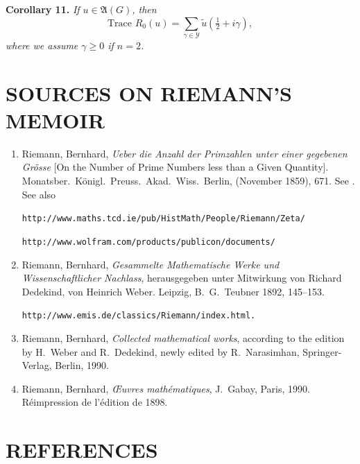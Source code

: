 \documentclass[12pt]{article}
\begin{document}
\medskip

\noindent
\textbf{Corollary 11.} \emph{If $u \in \mathfrak{A}(G)$, then}
\[
\text{Trace } R_{0}(u) = \sum_{\gamma \in \mathcal{Y}} \tilde{u}\left(\tfrac{1}{2} + i\gamma\right),
\]
\emph{where we assume $\gamma \geq 0$ if $n = 2$.}

\section*{SOURCES ON RIEMANN'S MEMOIR}

\begin{enumerate}
\item Riemann, Bernhard, \emph{Ueber die Anzahl der Primzahlen unter einer gegebenen Grösse} [On the Number of Prime Numbers less than a Given Quantity]. Monatsber.\ Königl.\ Preuss.\ Akad.\ Wiss.\ Berlin, (November 1859), 671. See \cite{R2,R3,R4}. See also

\texttt{http://www.maths.tcd.ie/pub/HistMath/People/Riemann/Zeta/}

\texttt{http://www.wolfram.com/products/publicon/documents/}

\item Riemann, Bernhard, \emph{Gesammelte Mathematische Werke und Wissenschaftlicher Nachlass}, herausgegeben unter Mitwirkung von Richard Dedekind, von Heinrich Weber. Leipzig, B.\ G.\ Teubner 1892, 145--153.

\texttt{http://www.emis.de/classics/Riemann/index.html.}

\item Riemann, Bernhard, \emph{Collected mathematical works}, according to the edition by H.\ Weber and R.\ Dedekind, newly edited by R.\ Narasimhan, Springer-Verlag, Berlin, 1990.

\item Riemann, Bernhard, \emph{Œuvres mathématiques}, J.\ Gabay, Paris, 1990. Réimpression de l'édition de 1898.
\end{enumerate}

\section*{REFERENCES}
\end{document}
